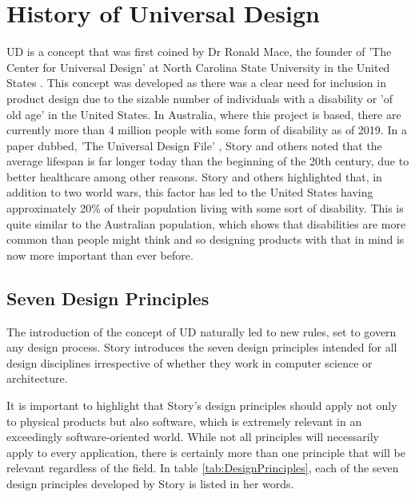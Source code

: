 \section{History of Universal Design} \label{History}
UD is a concept that was first coined by Dr Ronald Mace, the founder of 'The Center for Universal Design' at North Carolina State University in the United States \cite{ronald}.
This concept was developed as there was a clear need for inclusion in product design due to the sizable number of individuals with a disability or 'of old age' in the United States.
In Australia, where this project is based, there are currently more than 4 million people with some form of disability \cite{ausstats} as of 2019. 
In a paper dubbed, 'The Universal Design File' \cite{universalfile}, Story and others noted that the average lifespan is far longer today than the beginning of the 20th century, due to better healthcare among other reasons.
Story and others highlighted that, in addition to two world wars, this factor has led to the United States having approximately 20\% of their population living with some sort of disability.
This is quite similar to the Australian population, which shows that disabilities are more common than people might think and so designing products with that in mind is now more important than ever before.

\subsection{Seven Design Principles} \label{Seven Principles}

The introduction of the concept of UD naturally led to new rules, set to govern any design process.
Story introduces the seven design principles \cite{sevenprinciples} intended for all design disciplines irrespective of whether they work in computer science or architecture.

It is important to highlight that Story's design principles should apply not only to physical products but also software, which is extremely relevant in an exceedingly software-oriented world.
While not all principles will necessarily apply to every application, there is certainly more than one principle that will be relevant regardless of the field.
In table \ref{tab:DesignPrinciples}, each of the seven design principles developed by Story is listed in her words.

